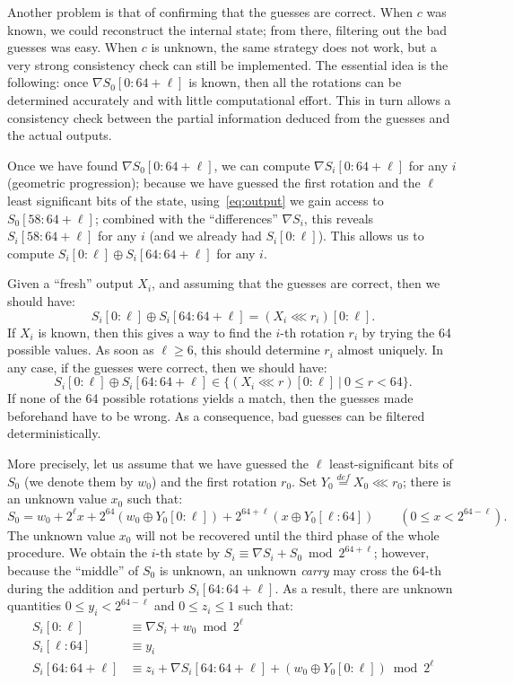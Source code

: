 \documentclass[preprint,svgnames]{iacrtrans}
\begin{document}
Another problem is that of confirming that the guesses are correct. When $c$ was
known, we could reconstruct the internal state; from there, filtering out the
bad guesses was easy. When $c$ is unknown, the same strategy does not work, but
a very strong consistency check can still be implemented. The essential idea is
the following: once $\nabla S_0[0:64+\ell]$ is known, then all the rotations can
be determined accurately and with little computational effort. This in turn
allows a consistency check between the partial information deduced from the
guesses and the actual outputs.

Once we have found $\nabla S_0[0:64+\ell]$, we can compute
$\nabla S_i[0:64+\ell]$ for any $i$ (geometric progression); because we have
guessed the first rotation and the $\ell$ least significant bits of the state,
using~\eqref{eq:output} we gain access to $S_0[58:64+\ell]$; combined with the
``differences'' $\nabla S_i$, this reveals $S_i[58:64+\ell]$ for any $i$ (and we
already had $S_i[0:\ell]$). This allows us to compute
$S_i[0:\ell] \oplus S_i[64:64+\ell]$ for any $i$.

Given a ``fresh'' output $X_i$, and assuming that the guesses are correct, then we should have:
\begin{equation}\label{eq:find_rotation}
  S_i[0:\ell] \oplus S_i[64:64+\ell] = (X_i \lll r_i)[0:\ell].
\end{equation}
If $X_i$ is known, then this gives a way to find the $i$-th rotation $r_i$ by
trying the 64 possible values. As soon as $\ell \geq 6$, this should determine
$r_i$ almost uniquely. In any case, if the guesses were correct, then we should have:
\begin{equation}\label{eq:consistency}
  S_i[0:\ell] \oplus S_i[64:64+\ell] \in \bigl\{ (X_i \lll r)[0:\ell]~|~0 \leq r < 64 \bigr\}.
\end{equation}
If none of the 64 possible rotations yields a match, then the guesses made
beforehand have to be wrong. As a consequence, bad guesses can be filtered
deterministically.

More precisely, let us assume that we have guessed the $\ell$ least-significant
bits of $S_0$ (we denote them by $w_0$) and the first rotation $r_0$. Set
$Y_0 \stackrel{def}{=} X_0 \lll r_0$; there is an unknown value
$x_0$ such that:
\[
  S_0 = w_0 + 2^\ell x + 2^{64} (w_0 \oplus Y_0[0:\ell]) + 2^{64+\ell} (x \oplus Y_0[\ell:64]) \qquad \left(0 \leq x < 2^{64-\ell}\right).
\]
The unknown value $x_0$ will not be recovered until the third phase of the whole
procedure. We obtain the $i$-th state by
$S_i \equiv \nabla S_i + S_0 \bmod 2^{64+\ell}$; however, because the ``middle''
of $S_0$ is unknown, an unknown \emph{carry} may cross the 64-th during the
addition and perturb $S_i[64:64+\ell]$. As a result, there are unknown
quantities $0 \leq y_i < 2^{64-\ell}$ and $0 \leq z_i \leq 1$ such that:
\begin{align*}
  S_i[0:\ell] &\equiv \nabla S_i + w_0 \bmod 2^\ell \\
  S_i[\ell:64] &\equiv y_i \\
  S_i[64:64+\ell] &\equiv z_i + \nabla S_i[64:64+\ell] + (w_0 \oplus Y_0[0:\ell]) \bmod 2^\ell \\
\end{align*}
\end{document}
